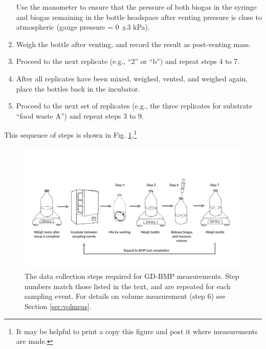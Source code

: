 \documentclass[]{article}
\begin{document}
\begin{enumerate}
      Use the manometer to ensure that the pressure of both biogas in the syringe and biogas remaining in the bottle headspace after venting pressure is close to atmospheric (gauge pressure = 0 $\pm3 $ kPa).
    \item Weigh the bottle after venting, and record the result as post-venting mass. 
    \item Proceed to the next replicate (e.g., ``2'' or ``b'') and repeat steps 4 to 7.
    \item After all replicates have been mixed, weighed, vented, and weighed again, place the bottles back in the incubator.
    \item Proceed to the next set of replicates (e.g., the three replicates for substrate ``food waste A'') and repeat steps 3 to 9.
\end{enumerate}

This sequence of steps is shown in Fig. \ref{fig:steps}.\footnote{It may be helpful to print a copy this figure and post it where measurements are made.}

\begin{figure}[ht]
  \includegraphics[width=\textwidth]{figs/GD_steps.pdf}
  \caption{The data collection steps required for GD-BMP measurements. Step numbers match those listed in the text, and are repeated for each sampling event. For details on volume measurement (step 6) see Section \ref{sec:volmeas}.}
  \label{fig:steps}
\end{figure}
\end{document}
